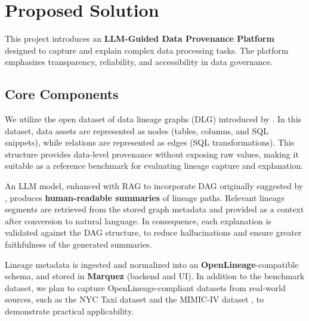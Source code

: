 \documentclass[9pt,letterpaper]{article}
\begin{document}
\section{Proposed Solution}

This project introduces an \textbf{LLM-Guided Data Provenance Platform} designed to capture and explain complex data processing tasks. The platform emphasizes transparency, reliability, and accessibility in data governance.

\subsection{Core Components}

\begin{description}[leftmargin=2em,itemsep=0.8em]
    \item[\textcolor{primaryblue}{\textbf{Benchmark Data:}}]
          We utilize the open dataset of data lineage graphs (DLG) introduced by \cite{CHEN20241}. In this dataset, data assets are represented as nodes (tables, columns, and SQL snippets), while relations are represented as edges (SQL transformations). This structure provides data-level provenance without exposing raw values, making it suitable as a reference benchmark for evaluating lineage capture and explanation.

    \item[\textcolor{primaryblue}{\textbf{RAG-to-DAG:}}] An LLM model, enhanced with RAG to incorporate DAG originally suggested by \cite{hu-etal-2025-grag}, produces \textbf{human-readable summaries} of lineage paths. Relevant lineage segments are retrieved from the stored graph metadata and provided as a context after conversion to natural language. In consequence, each explanation is validated against the DAG structure, to reduce hallucinations and ensure greater faithfulness of the generated summaries.

    \item[\textcolor{primaryblue}{\textbf{Lineage Capture:}}]
          Lineage metadata is ingested and normalized into an \textbf{OpenLineage}-compatible schema, and stored in \textbf{Marquez} (backend and UI). In addition to the benchmark dataset, we plan to capture OpenLineage-compliant datasets from real-world sources, such as the NYC Taxi dataset \cite{sciencedirect2024} and the MIMIC-IV dataset \cite{johnson_mimic-iv_2023}, to demonstrate practical applicability.



\end{description}
\end{document}
